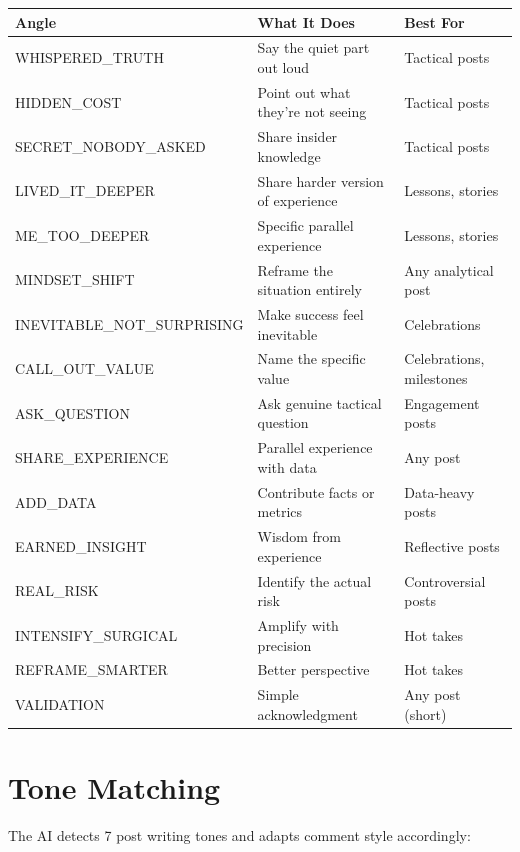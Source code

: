 \documentclass[12pt,a4paper]{article}
\begin{document}
\begin{center}
\small
\begin{tabularx}{\textwidth}{lXl}
\toprule
\textbf{Angle} & \textbf{What It Does} & \textbf{Best For} \\
\midrule
WHISPERED\_TRUTH & Say the quiet part out loud & Tactical posts \\
HIDDEN\_COST & Point out what they're not seeing & Tactical posts \\
SECRET\_NOBODY\_ASKED & Share insider knowledge & Tactical posts \\
LIVED\_IT\_DEEPER & Share harder version of experience & Lessons, stories \\
ME\_TOO\_DEEPER & Specific parallel experience & Lessons, stories \\
MINDSET\_SHIFT & Reframe the situation entirely & Any analytical post \\
INEVITABLE\_NOT\_SURPRISING & Make success feel inevitable & Celebrations \\
CALL\_OUT\_VALUE & Name the specific value & Celebrations, milestones \\
ASK\_QUESTION & Ask genuine tactical question & Engagement posts \\
SHARE\_EXPERIENCE & Parallel experience with data & Any post \\
ADD\_DATA & Contribute facts or metrics & Data-heavy posts \\
EARNED\_INSIGHT & Wisdom from experience & Reflective posts \\
REAL\_RISK & Identify the actual risk & Controversial posts \\
INTENSIFY\_SURGICAL & Amplify with precision & Hot takes \\
REFRAME\_SMARTER & Better perspective & Hot takes \\
VALIDATION & Simple acknowledgment & Any post (short) \\
\bottomrule
\end{tabularx}
\end{center}

\section{Tone Matching}

The AI detects 7 post writing tones and adapts comment style accordingly:
\end{document}
